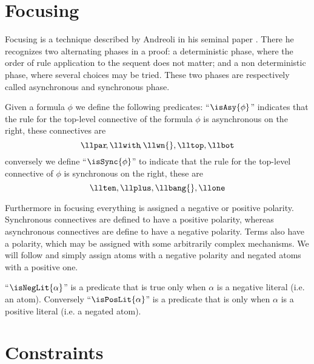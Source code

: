 \section{Focusing}
Focusing is a technique described by Andreoli in his seminal paper \cite{Focusing}.
There he recognizes two alternating phases in a proof: a deterministic phase, where the order of rule application to the sequent does not matter; and a non deterministic phase, where several choices may be tried.
These two phases are respectively called asynchronous and synchronous phase.
\begin{define}
	Given a formula $\phi$ we define the following predicates:
	``$\isAsy{\phi}$'' indicates that the rule for the top-level connective of the formula $\phi$ is asynchronous on the right, these connectives are 
	$$ \llpar\!, \llwith\!, \llwn{}, \lltop, \llbot $$
	conversely we define ``$\isSync{\phi}$'' to indicate that the rule for the top-level connective of $\phi$ is synchronous on the right, these are
	$$ \llten, \llplus, \llbang{}, \llone $$
\end{define}
Furthermore in focusing everything is assigned a negative or positive polarity.
Synchronous connectives are defined to have a positive polarity, whereas asynchronous connectives are define to have a negative polarity.
Terms also have a polarity, which may be assigned with some arbitrarily complex mechanisms.
We will follow \cite{LiangMiller} and simply assign atoms with a negative polarity and negated atoms with a positive one.
\begin{define}
	``$\isNegLit{\alpha}$'' is a predicate that is true only when $\alpha$ is a negative literal (i.e. an atom).
	Conversely ``$\isPosLit{\alpha}$'' is a predicate that is only when $\alpha$ is a positive literal (i.e. a negated atom).
\end{define}

\section{Constraints}

